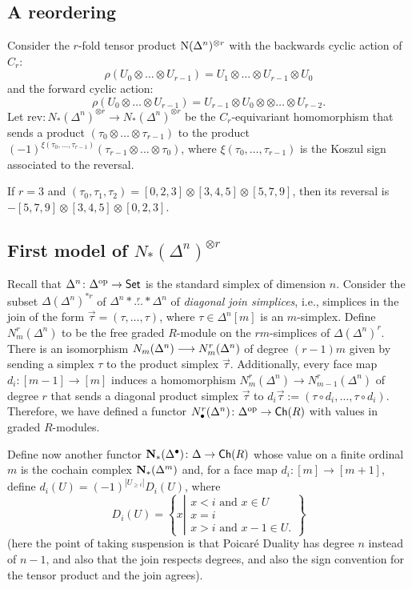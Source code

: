 \subsection{A reordering} Consider the $r$-fold tensor product $\operatorname{N}(\Delta^n)^{\otimes r}$ with the backwards cyclic action of $C_r$:
\[\rho(U_0\otimes \ldots\otimes U_{r-1}) = U_1\otimes \ldots \otimes U_{r-1}\otimes U_0\]
and the forward cyclic action:
\[\rho(U_0\otimes \ldots\otimes U_{r-1}) = U_{r-1}\otimes U_0\otimes \otimes \ldots \otimes U_{r-2}.\]
Let $\mathrm{rev}\colon N_*(\Delta^n)^{\otimes r}\to N_*(\Delta^n)^{\otimes r}$ be the $C_r$-equivariant homomorphism that sends a product $(\tau_0\otimes\ldots\otimes \tau_{r-1})$ to the product $(-1)^{\xi(\tau_{0},\ldots,\tau_{r-1})}(\tau_{r-1}\otimes\ldots\otimes \tau_0)$, where $\xi(\tau_0,\ldots,\tau_{r-1})$ is the Koszul sign associated to the reversal.
\begin{example}\label{ex:101}
    If $r=3$ and $(\tau_0,\tau_1,\tau_2) = [0,2,3]\otimes [3,4,5] \otimes [5,7,9]$, then its reversal is $-[5,7,9]\otimes [3,4,5]\otimes [0,2,3]$.
\end{example}


\subsection{First model of $N_*(\Delta^n)^{\otimes r}$} Recall that $\Delta^n\colon \Delta^{\mathrm{op}}\to \mathsf{Set}$ is the standard simplex of dimension $n$. Consider the subset $\Delta(\Delta^n)^{*r}$ of $\Delta^n* \overset{r}{\ldots}* \Delta^n$ of \emph{diagonal join simplices}, i.e., simplices in the join of the form $\vec{\tau} = (\tau,\ldots,\tau)$, where $\tau\in \Delta^n[m]$ is an $m$-simplex. Define $N_m^r(\Delta^n)$ to be the free graded $R$-module on the $rm$-simplices of $\Delta(\Delta^n)^r$. There is an isomorphism $N_m(\Delta^n)\longrightarrow N_m^r(\Delta^n)$ of degree $(r-1)m$ given by sending a simplex $\tau$ to the product simplex $\vec{\tau}$. Additionally, every face map $d_i\colon [m-1]\to [m]$ induces a homomorphism $N_m^r(\Delta^n)\to N_{m-1}^r(\Delta^n)$ of degree $r$ that sends a diagonal product simplex $\vec{\tau}$ to $d_i\vec{\tau}:= (\tau\circ d_i,\ldots,\tau\circ d_i)$. Therefore, we have defined a functor $N_\bullet^r(\Delta^n)\colon \Delta^{\mathrm{op}}\to \mathsf{Ch}(R)$ with values in graded $R$-modules.

Define now another functor $\mathbf{N}_*(\Delta^\bullet)\colon \Delta\to \mathsf{Ch}(R)$ whose value on a finite ordinal $m$ is the cochain complex $\mathbf{N}_*(\Delta^m)$ and, for a face map $d_i\colon [m]\to [m+1]$, define $d_i(U) = (-1)^{|U_{\geq i}|}D_i(U)$, where
\[D_i(U) = \left\{
x\left| \begin{array}{l}
x<i \text{ and } x\in U \\
x=i \\
x>i \text{ and } x-1 \in U.
\end{array}\right.
\right\}
\]
(here the point of taking suspension is that Poicaré Duality has degree $n$ instead of $n-1$, and also that the join respects degrees, and also the sign convention for the tensor product and the join agrees).


